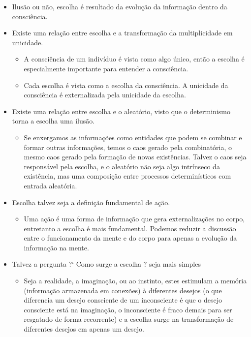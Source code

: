\documentclass[10pt,a4paper]{report}
\begin{document}
\begin{itemize}
	\item[ (i) ] Ilusão ou não, escolha é resultado da evolução da informação dentro da consciência.
	\item[ (ii) ] Existe uma relação entre escolha e a transformação da multiplicidade em unicidade.
	\begin{itemize}
		\item[ (i) ] A consciência de um indivíduo é vista como algo único, então a escolha é especialmente importante para entender a consciência. 
		\item[ (ii) ] Cada escolha é vista como a escolha da consciência. A unicidade da consciência é externalizada pela unicidade da escolha.
	\end{itemize}
	\item[ (iii) ] Existe uma relação entre escolha e o aleatório, visto que o determinismo torna a escolha uma ilusão.
	\begin{itemize}
		\item[ (i) ] Se enxergamos as informações como entidades que podem se combinar e formar outras informações, temos o caos gerado pela combinatória, o mesmo caos gerado pela formação de novas existências. Talvez o caos seja responsável pela escolha, e o aleatório não seja algo intrínseco da existência, mas uma composição entre processos determinísticos com entrada aleatória. 
	\end{itemize}
	\item[ (iv) ] Escolha talvez seja a definição fundamental de ação.
	\begin{itemize}
		\item[ (ii) ] Uma ação é uma forma de informação que gera externalizações no corpo, entretanto a escolha é mais fundamental. Podemos reduzir a discussão entre o funcionamento da mente e do corpo para apenas a evolução da informação na mente.
	\end{itemize}	
	\item[ (v) ] Talvez a pergunta ?` Como surge a escolha ? seja mais simples
	\begin{itemize}
		\item[ (i) ] Seja a realidade, a imaginação, ou ao instinto, estes estimulam a memória (informação armazenada em conexões) à diferentes desejos (o que diferencia um desejo consciente de um inconsciente é que o desejo consciente está na imaginação, o inconsciente é fraco demais para ser resgatado de forma recorrente) e a escolha surge na transformação de diferentes desejos em apenas um desejo.

\end{itemize}
\end{itemize}
\end{document}
